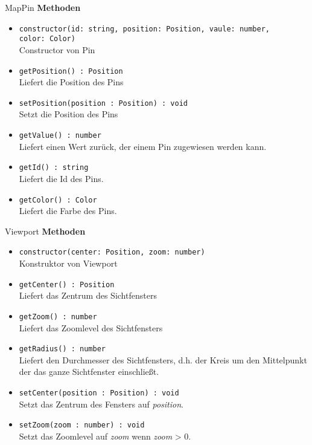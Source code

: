     \begin{Class}{MapPin}
        \textbf{Methoden}
        \begin{itemize}
            \item \texttt{constructor(id: string, position: Position, vaule: number,\\
            color: Color)}
            \\Constructor von Pin

            \bigskip
            \item \texttt{getPosition() : Position}
            \\ Liefert die Position des Pins
            \item \texttt{setPosition(position : Position) : void}
            \\ Setzt die Position des Pins

            \bigskip
            \item \texttt{getValue() : number}
            \\ Liefert einen Wert zurück, der einem Pin zugewiesen werden kann.

            \bigskip
            \item \texttt{getId() : string}
            \\ Liefert die Id des Pins.

            \bigskip
            \item \texttt{getColor() : Color}
            \\ Liefert die Farbe des Pins.
        \end{itemize}
    \end{Class}

    \begin{Class}{Viewport}
        \textbf{Methoden}
        \begin{itemize}
            \item \texttt{constructor(center: Position, zoom: number)}
            \\ Konstruktor von Viewport
            \item \texttt{getCenter() : Position}
            \\ Liefert das Zentrum des Sichtfensters 
            \item \texttt{getZoom() : number}
            \\ Liefert das Zoomlevel des Sichtfensters
            \item \texttt{getRadius() : number}
            \\ Liefert den Durchmesser des Sichtfensters, 
            d.h. der Kreis um den Mittelpunkt der das ganze Sichtfenster einschließt.
            \item \texttt{setCenter(position : Position) : void}
            \\ Setzt das Zentrum des Fensters auf \emph{position}.
            \item \texttt{setZoom(zoom : number) : void}
            \\ Setzt das Zoomlevel auf \emph{zoom} wenn \emph{zoom} > 0.
        \end{itemize}
    \end{Class}

